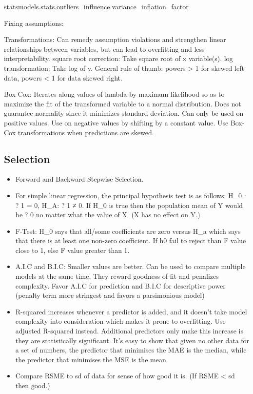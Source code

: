\documentclass[]{book}
\newenvironment{Shaded}{\begin{snugshade}}{\end{snugshade}}
\newcommand{\NormalTok}[1]{#1}
\begin{document}
\begin{Shaded}
\begin{Highlighting}[]
\NormalTok{statsmodels.stats.outliers_influence.variance_inflation_factor}
\end{Highlighting}
\end{Shaded}

Fixing assumptions:

Transformations: Can remedy assumption violations and strengthen linear
relationships between variables, but can lead to overfitting and less
interpretability. square root correction: Take square root of x
variable(s). log transformation: Take log of y. General rule of thumb:
powers \textgreater{} 1 for skewed left data, powers \textless{} 1 for
data skewed right.

Box-Cox: Iterates along values of lambda by maximum likelihood so as to
maximize the fit of the transformed variable to a normal distribution.
Does not guarantee normality since it minimizes standard deviation. Can
only be used on positive values. Use on negative values by shifting by a
constant value. Use Box-Cox transformations when predictions are skewed.

\subsection{Selection}\label{selection}

\begin{itemize}
\item
  Forward and Backward Stepwise Selection.
\item
  For simple linear regression, the principal hypothesis test is as
  follows: H\_0 : ? 1 = 0, H\_A: ? 1 ≠ 0. If H\_0 is true then the
  population mean of Y would be ? 0 no matter what the value of X. (X
  has no effect on Y.)
\item
  F-Test: H\_0 says that all/some coefficients are zero versus H\_a
  which says that there is at least one non-zero coefficient. If h0 fail
  to reject than F value close to 1, else F value greater than 1.
\item
  A.I.C and B.I.C: Smaller values are better. Can be used to compare
  multiple models at the same time. They reward goodness of fit and
  penalizes complexity. Favor A.I.C for prediction and B.I.C for
  descriptive power (penalty term more stringest and favors a
  parsimonious model)
\item
  R-squared increases whenever a predictor is added, and it doesn't take
  model complexity into consideration which makes it prone to
  overfitting. Use adjusted R-squared instead. Additional predictors
  only make this increase is they are statistically significant. It's
  easy to show that given no other data for a set of numbers, the
  predictor that minimises the MAE is the median, while the predictor
  that minimises the MSE is the mean.
\item
  Compare RSME to sd of data for sense of how good it is. (If RSME
  \textless{} sd then good.)
\end{itemize}
\end{document}
